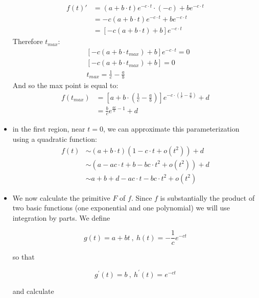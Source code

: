 \documentclass{article}
\begin{document}
\begin{appendices}
\begin{itemize}
\begin{equation}
\begin{split}
f(t)'&= (a + b \cdot t) e^{-c \cdot t} \cdot(-c) + be^{-c \cdot t} \\
&= -c(a + b \cdot t) e^{-c \cdot t} + be^{-c \cdot t}\\
&= [-c(a + b \cdot t)+ b]e^{-c \cdot t}
\end{split}
\end{equation}
Therefore $t_{max}$:
\begin{equation}
\begin{split}
&[-c(a + b \cdot t_{max})+ b]e^{-c \cdot t} = 0 \\
&[-c(a + b \cdot t_{max})+ b] = 0 \\
&t_{max} = \frac{1}{c} -\frac{a}{b}
\end{split}
\end{equation}
And so the max point is equal to:
\begin{equation}
\begin{split}
f(t_{max})&= [a + b \cdot (\frac{1}{c} -\frac{a}{b})] e^{-c \cdot (\frac{1}{c} -\frac{a}{b})} + d \\
&= \frac{b}{c}e^{\frac{ac}{b} -1} + d
\end{split}
\end{equation}

\item in the first region, near $t=0$, we can approximate this parameterization using a quadratic function:
\begin{equation}
\begin{split}
f(t) &\sim (a + b\cdot t)(1- c \cdot t + o(t^2)) + d\\
&\sim (a - ac\cdot t +b - bc\cdot t^2 + o(t^2)) + d\\
&\sim a + b + d - ac\cdot t - bc\cdot t^2 + o(t^2)
\end{split}
\end{equation}

\item We now calculate the primitive $F$ of $f$. Since $f$ is substantially the product of two basic functions (one exponential and one polynomial) we will use integration by parts. We define

$$
g(t)=a + bt\ ,\ h(t)=-\frac{1}{c} e^{-ct}
$$

so that

$$
g^{\prime}(t)=b\ ,\ h^{\prime}(t)=e^{-ct}
$$

and calculate


\end{itemize}
\end{appendices}
\end{document}

